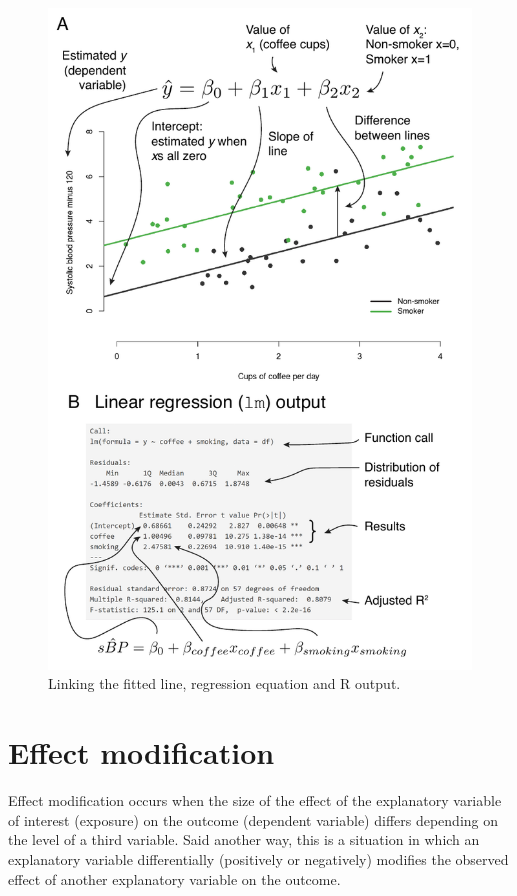 \documentclass[12pt,]{krantz}
\theoremstyle{definition}
\theoremstyle{definition}
\theoremstyle{definition}
\theoremstyle{remark}
\begin{document}
\begin{figure}
\centering
\includegraphics{images/chapter07/4_equation.pdf}
\caption{\label{fig:chap07-fig-equation}Linking the fitted line, regression
equation and R output.}
\end{figure}

\hypertarget{effect-modification}{%
\section{Effect modification}\label{effect-modification}}

Effect modification occurs when the size of the effect of the
explanatory variable of interest (exposure) on the outcome (dependent
variable) differs depending on the level of a third variable. Said
another way, this is a situation in which an explanatory variable
differentially (positively or negatively) modifies the observed effect
of another explanatory variable on the outcome.
\end{document}
